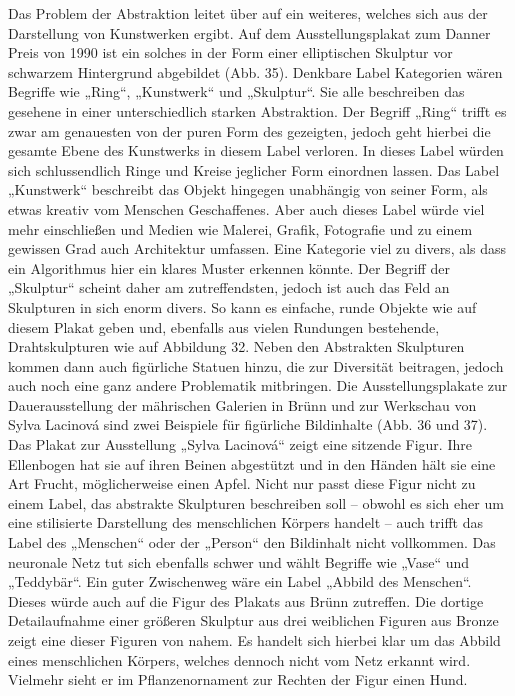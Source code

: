 \documentclass[a4paper,12pt,ngerman]{article}
\begin{document}
Das Problem der Abstraktion leitet über auf ein weiteres, welches sich aus der Darstellung von Kunstwerken ergibt. Auf dem Ausstellungsplakat zum Danner Preis von 1990 ist ein solches in der Form einer elliptischen Skulptur vor schwarzem Hintergrund abgebildet (Abb. 35). Denkbare Label Kategorien wären Begriffe wie „Ring“, „Kunstwerk“ und „Skulptur“. Sie alle beschreiben das gesehene in einer unterschiedlich starken Abstraktion. Der Begriff „Ring“ trifft es zwar am genauesten von der puren Form des gezeigten, jedoch geht hierbei die gesamte Ebene des Kunstwerks in diesem Label verloren. In dieses Label würden sich schlussendlich Ringe und Kreise jeglicher Form einordnen lassen. Das Label „Kunstwerk“ beschreibt das Objekt hingegen unabhängig von seiner Form, als etwas kreativ vom Menschen Geschaffenes. Aber auch dieses Label würde viel mehr einschließen und Medien wie Malerei, Grafik, Fotografie und zu einem gewissen Grad auch Architektur umfassen. Eine Kategorie viel zu divers, als dass ein Algorithmus hier ein klares Muster erkennen könnte. Der Begriff der „Skulptur“ scheint daher am zutreffendsten, jedoch ist auch das Feld an Skulpturen in sich enorm divers. So kann es einfache, runde Objekte wie auf diesem Plakat geben und, ebenfalls aus vielen Rundungen bestehende, Drahtskulpturen wie auf Abbildung 32. Neben den Abstrakten Skulpturen kommen dann auch figürliche Statuen hinzu, die zur Diversität beitragen, jedoch auch noch eine ganz andere Problematik mitbringen. Die Ausstellungsplakate zur Dauerausstellung der mährischen Galerien in Brünn und zur Werkschau von Sylva Lacinová sind zwei Beispiele für figürliche Bildinhalte (Abb. 36 und 37). Das Plakat zur Ausstellung „Sylva Lacinová“ zeigt eine sitzende Figur. Ihre Ellenbogen hat sie auf ihren Beinen abgestützt und in den Händen hält sie eine Art Frucht, möglicherweise einen Apfel. Nicht nur passt diese Figur nicht zu einem Label, das abstrakte Skulpturen beschreiben soll – obwohl es sich eher um eine stilisierte Darstellung des menschlichen Körpers handelt – auch trifft das Label des „Menschen“ oder der „Person“ den Bildinhalt nicht vollkommen. Das neuronale Netz tut sich ebenfalls schwer und wählt Begriffe wie „Vase“ und „Teddybär“. Ein guter Zwischenweg wäre ein Label „Abbild des Menschen“. Dieses würde auch auf die Figur des Plakats aus Brünn zutreffen. Die dortige Detailaufnahme einer größeren Skulptur aus drei weiblichen Figuren aus Bronze zeigt eine dieser Figuren von nahem. Es handelt sich hierbei klar um das Abbild eines menschlichen Körpers, welches dennoch nicht vom Netz erkannt wird. Vielmehr sieht er im Pflanzenornament zur Rechten der Figur einen Hund. \\
\end{document}
